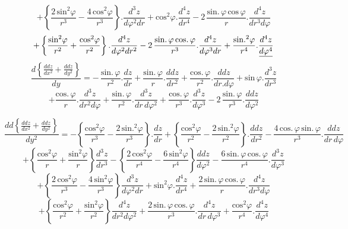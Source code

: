 \documentclass[11pt,a4paper]{article}
\begin{document}
\[ + \left\{\frac{2\,\text{sin}^{2}\varphi}{r^{3}} - \frac{4\,\text{cos}^{2}\varphi}{r^{3}}\right\}.\frac{d^{3}z}{d\varphi^{2}dr} + \text{cos}^{2}\varphi.\frac{d^{4}z}{dr^{4}} - 2\,\frac{\text{sin.}\,\varphi\,\text{cos}\,\varphi}{r}.\frac{d^{4}z}{dr^{3}d\varphi} \]
\[ + \left\{\frac{\text{sin}^{2}\varphi}{r^{2}} + \frac{\text{cos}^{2}\varphi}{r^{2}}\right\}.\frac{d^{4}z}{d\varphi^{2}dr^{2}} - 2\,\frac{\text{sin.}\,\varphi\,\text{cos.}\,\varphi}{r^{3}}.\frac{d^{4}z}{d\varphi^{3}dr} + \frac{\text{sin.}^{2}\varphi}{r^{4}}.\frac{d^{4}z}{\uncertain{d\varphi^{4}}} \]
\[ \frac{d\left\{\frac{ddz}{dx^{2}} + \frac{ddz}{dy^{2}}\right\}}{dy} = -\,\frac{\text{sin.}\,\varphi}{r^{2}}.\frac{dz}{dr} + \frac{\text{sin.}\,\varphi}{r}.\frac{ddz}{dr^{2}} + \frac{\text{cos.}\,\varphi}{r^{2}}.\frac{ddz}{dr.d\varphi} + \text{sin}\,\varphi.\frac{d^{3}z}{dr^{3}} \]
\[ + \frac{\text{cos.}\,\varphi}{r}.\frac{d^{3}z}{dr^{2}d\varphi} + \frac{\text{sin.}\,\varphi}{r^{2}}.\frac{d^{3}z}{dr\,d\varphi^{2}} + \frac{\text{cos.}\,\varphi}{r^{3}}.\frac{d^{3}z}{d\varphi^{3}} - 2\,\frac{\text{sin.}\,\varphi}{r^{3}}.\frac{ddz}{d\varphi^{2}} \]



\[ \frac{dd\left\{\frac{ddz}{dx^{2}} + \frac{ddz}{dy^{2}}\right\}}{dy^{2}} = -\left\{\frac{\text{cos}^{2}\varphi}{r^{3}} - \frac{2\,\text{sin.}^{2}\varphi}{r^{3}}\right\}.\frac{dz}{dr} + \left\{\frac{\text{cos}^{2}\varphi}{r^{2}} - \frac{2\,\text{sin.}^{2}\varphi}{r^{2}}\right\}.\frac{ddz}{dr^{2}} - \frac{4\,\text{cos.}\,\varphi\,\text{sin.}\,\varphi}{r^{3}}.\frac{ddz}{dr\,d\varphi} \]
\[ + \left\{\frac{\text{cos}^{2}\varphi}{r} + \frac{\text{sin}^{2}\varphi}{r}\right\}\frac{d^{3}z}{dr^{3}} - \left\{\frac{2\,\text{cos}^{2}\varphi}{r^{4}} - \frac{6\,\text{sin}^{2}\varphi}{r^{4}}\right\}\frac{ddz}{d\varphi^{2}} - \frac{6\,\text{sin.}\,\varphi\,\text{cos.}\,\varphi}{r^{4}}.\frac{d^{3}z}{d\varphi^{3}} \]
\[ + \left\{\frac{2\,\text{cos}^{2}\varphi}{r^{3}} - \frac{4\,\text{sin}^{2}\varphi}{r^{3}}\right\}\frac{d^{3}z}{d\varphi^{2}dr} + \text{sin}^{2}\varphi.\frac{d^{4}z}{dr^{4}} + \frac{2\,\text{sin.}\,\varphi\,\text{cos.}\,\varphi}{r}.\frac{d^{4}z}{dr^{3}d\varphi} \]
\[ + \left\{\frac{\text{cos}^{2}\varphi}{r^{2}} + \frac{\text{sin}^{2}\varphi}{r^{2}}\right\}\frac{d^{4}z}{dr^{2}d\varphi^{2}} + \frac{2\,\text{sin.}\,\varphi\,\text{cos.}\,\varphi}{r^{3}}.\frac{d^{4}z}{dr\,d\varphi^{3}} + \frac{\text{cos}^{2}\varphi}{r^{4}}.\frac{d^{4}z}{d\varphi^{4}} \]
\end{document}
